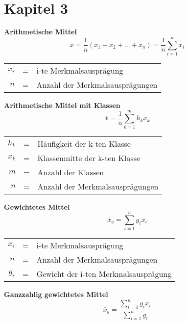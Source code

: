 \documentclass[11pt,twocolumn,fleqn]{article}
\begin{document}
\footnotesize

\section{Kapitel 3}

\textbf{Arithmetische Mittel}
\begin{equation*}
\overline{x} = \frac{1}{n}(x_1+x_2+...+x_n)=\frac{1}{n}\sum_{i=1}^{n}x_i
\end{equation*}
\begin{center}\begin{tabular}{rcl}
   $x_i$ & = & i-te Merkmalsausprägung  \\
   $n$ & = & Anzahl der Merkmalsausprägungen \\
\end{tabular}\end{center}


\textbf{Arithmetische Mittel mit Klassen}
\begin{equation*}
\overline{x} = \frac{1}{n}\sum_{k=1}^{m}h_kx_k
\end{equation*}
\begin{center}\begin{tabular}{rcl}
   $h_k$ & = & Häufigkeit der k-ten Klasse  \\
   $x_k$ & = & Klassenmitte der k-ten Klasse \\
   $m$   & = & Anzahl der Klassen  \\
   $n$   & = & Anzahl der Merkmalsausprägungen \\
\end{tabular}\end{center}

\textbf{Gewichtetes Mittel}
\begin{equation*}
\overline{x}_g = \sum_{i=1}^{n}g_ix_i
\end{equation*}
\begin{center}\begin{tabular}{rcl}
   $x_i$ & = & i-te Merkmalsausprägung  \\
   $n$ & = & Anzahl der Merkmalsausprägungen \\
   $g_i$   & = &  Gewicht der i-ten Merkmalsausprägung \\
\end{tabular}\end{center}


\textbf{Ganzzahlig gewichtetes Mittel}
\begin{equation*}
\overline{x}_g = \frac{\sum_{i=1}^{n}g_ix_i}{\sum^{n}_{i=1}g_i}
\end{equation*}
\end{document}
